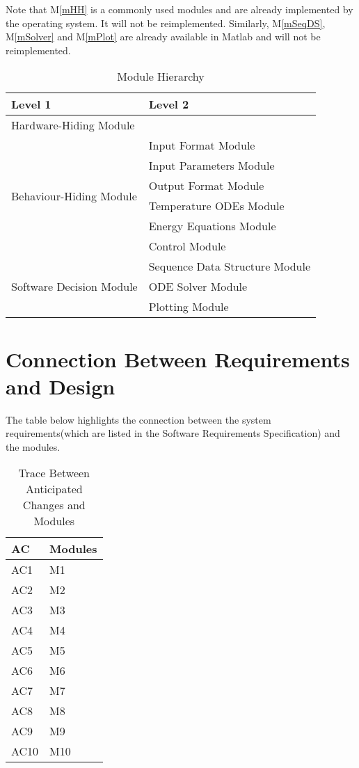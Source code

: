 \documentclass[12pt]{article}
\newcommand{\mref}[1]{M\ref{#1}}
\begin{document}
Note that \mref{mHH} is a commonly used modules and are already implemented by the operating
system.  It will not be reimplemented.  Similarly, \mref{mSeqDS}, \mref{mSolver}
and \mref{mPlot} are already available in Matlab and will not be reimplemented.

\begin{table}[h!]
\centering
\begin{tabular}{p{} p{}}
\toprule
\textbf{Level 1} & \textbf{Level 2}\\
\midrule

{Hardware-Hiding Module} & ~ \\
\midrule

\multirow{6}{0.3\textwidth}{Behaviour-Hiding Module} & Input Format Module\\
& Input Parameters Module\\
& Output Format Module\\
& Temperature ODEs Module\\
& Energy Equations Module\\ 
& Control Module\\
\midrule

\multirow{3}{0.3\textwidth}{Software Decision Module} & {Sequence Data Structure Module}\\
& ODE Solver Module\\
& Plotting Module\\
\bottomrule

\end{tabular}
\caption{Module Hierarchy}
\label{TblMH}
\end{table}

\section{Connection Between Requirements and Design} \label{SecConnection}

The table below highlights the connection between the system requirements(which are listed in the Software Requirements Specification) and the modules.

\begin{table}[H]
\centering
\begin{tabular}{p{} p{}}
\toprule
\textbf{AC} & \textbf{Modules}\\
\midrule
AC1 & M1\\
AC2 & M2\\
AC3 & M3\\
AC4 & M4\\
AC5 & M5\\
AC6 & M6\\
AC7 & M7\\
AC8 & M8\\
AC9 & M9\\
AC10 & M10\\
\bottomrule
\end{tabular}
\caption{Trace Between Anticipated Changes and Modules}
\label{TblRT}
\end{table}
\end{document}
